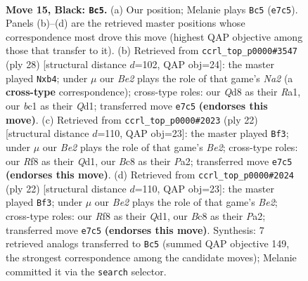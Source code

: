 \documentclass[11pt]{article}
\begin{document}
\clearpage

\begin{figure}[p]\centering
\begin{subfigure}{0.46\textwidth}\centering
\resizebox{\linewidth}{!}{%
\newchessgame
\chessboard[
  setfen={rnbq1r2/pp1nbk2/4p1p1/3P2P1/P7/2N2N2/1P3P2/R1BQKB1R b KQ - 0 15},
  showmover=false,
  pgfstyle=straightmove, color=movearrow, markmove={e7-c5}
]}
\caption{}
\end{subfigure}\hfill
\begin{subfigure}{0.46\textwidth}\centering
\resizebox{\linewidth}{!}{%
\newchessgame
\chessboard[
  setfen={rnbqr1k1/4bppp/p2p4/3P4/1p2n3/5N1P/NP2BPP1/R1BQ1RK1 w - - 0 15},
  showmover=false,
  pgfstyle=straightmove, color=movearrow, markmove={a2-b4}
]}
\caption{}
\end{subfigure}
\\[4pt]
\begin{subfigure}{0.46\textwidth}\centering
\resizebox{\linewidth}{!}{%
\newchessgame
\chessboard[
  setfen={r1bqk2r/5ppp/p1pb1n2/3p4/8/2N1P3/PP1BBPPP/2RQK2R w Kkq - 0 12},
  showmover=false,
  pgfstyle=straightmove, color=movearrow, markmove={e2-f3}
]}
\caption{}
\end{subfigure}\hfill
\begin{subfigure}{0.46\textwidth}\centering
\resizebox{\linewidth}{!}{%
\newchessgame
\chessboard[
  setfen={r1bqk2r/5ppp/p1pb1n2/3p4/8/2N1P3/PP1BBPPP/2RQK2R w Kkq - 0 12},
  showmover=false,
  pgfstyle=straightmove, color=movearrow, markmove={e2-f3}
]}
\caption{}
\end{subfigure}
\caption{\textbf{Move 15, Black: \texttt{Bc5}.} (a) Our position; Melanie plays \texttt{Bc5} (\texttt{e7c5}). Panels (b)--(d) are the retrieved master positions whose correspondence most drove this move (highest QAP objective among those that transfer to it). (b) Retrieved from \texttt{ccrl\_top\_p0000\#3547} (ply 28) [structural distance $d$=102, QAP obj=24]: the master played \texttt{Nxb4}; under $\mu$ our \emph{Be2} plays the role of that game's \emph{Na2} (a \textbf{cross-type} correspondence); cross-type roles: our \emph{Q}d8 as their \emph{R}a1, our \emph{b}c1 as their \emph{Q}d1; transferred move \texttt{e7c5} \textbf{(endorses this move)}. (c) Retrieved from \texttt{ccrl\_top\_p0000\#2023} (ply 22) [structural distance $d$=110, QAP obj=23]: the master played \texttt{Bf3}; under $\mu$ our \emph{Be2} plays the role of that game's \emph{Be2}; cross-type roles: our \emph{R}f8 as their \emph{Q}d1, our \emph{B}c8 as their \emph{P}a2; transferred move \texttt{e7c5} \textbf{(endorses this move)}. (d) Retrieved from \texttt{ccrl\_top\_p0000\#2024} (ply 22) [structural distance $d$=110, QAP obj=23]: the master played \texttt{Bf3}; under $\mu$ our \emph{Be2} plays the role of that game's \emph{Be2}; cross-type roles: our \emph{R}f8 as their \emph{Q}d1, our \emph{B}c8 as their \emph{P}a2; transferred move \texttt{e7c5} \textbf{(endorses this move)}. Synthesis: 7 retrieved analogs transferred to \texttt{Bc5} (summed QAP objective 149, the strongest correspondence among the candidate moves); Melanie committed it via the \texttt{search} selector.}
\label{fig:thought-m29}
\end{figure}
\end{document}
